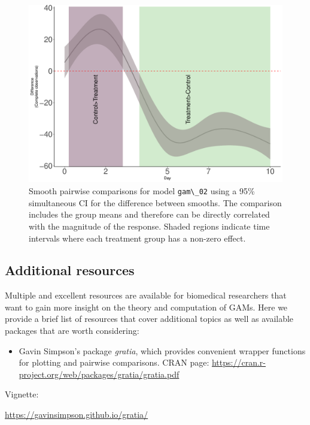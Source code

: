 \documentclass[
]{article}
\newcommand{\passthrough}[1]{#1}
\providecommand{\tightlist}{%
  \setlength{\itemsep}{0pt}\setlength{\parskip}{0pt}}
\begin{document}
\begin{figure}

{\centering \includegraphics[width=0.75\linewidth]{Appendix_A_files/figure-latex/pairwise-comp-workflow-fig-1} 

}

\caption{Smooth pairwise comparisons for model \passthrough{\lstinline!gam\_02!} using a 95\% simultaneous CI for the difference between smooths. The comparison includes the group means and therefore can be directly correlated with the magnitude of the response. Shaded regions indicate time intervals where each treatment group has a non-zero effect.}\label{fig:pairwise-comp-workflow-fig}
\end{figure}
 \FloatBarrier

\hypertarget{additional-resources}{%
\subsection{Additional resources}\label{additional-resources}}

Multiple and excellent resources are available for biomedical researchers that want to gain more insight on the theory and computation of GAMs. Here we provide a brief list of resources that cover additional topics as well as available packages that are worth considering:

\begin{itemize}
\tightlist
\item
  Gavin Simpson's package \emph{gratia}, which provides convenient wrapper functions for plotting and pairwise comparisons.
  CRAN page:
  \url{https://cran.r-project.org/web/packages/gratia/gratia.pdf}
\end{itemize}

Vignette:

\url{https://gavinsimpson.github.io/gratia/}
\end{document}
